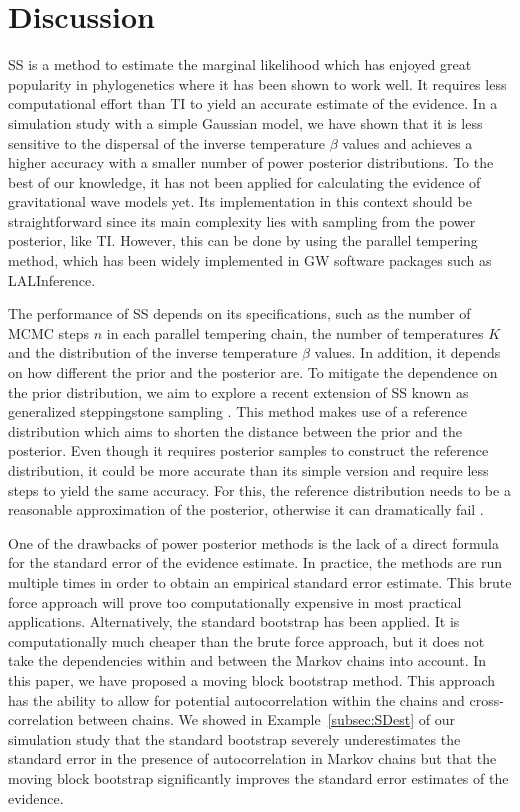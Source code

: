 \documentclass[aps,reprint,amsmath,amssymb,showpacs,showkeys]{revtex4-1}%
\begin{document}
\section{Discussion}
SS is a method to estimate the marginal likelihood which has enjoyed great popularity in phylogenetics where it has been shown to work well.  It requires  less computational effort than TI to yield an accurate estimate of the evidence. In a simulation study with a simple Gaussian model, we have shown that it is less sensitive to the dispersal of the inverse temperature  $\beta$ values and achieves a higher accuracy with a smaller number of power posterior distributions.  To the best of our knowledge, it has not been applied for calculating the evidence of gravitational wave models yet.  Its implementation in this context should be straightforward since its main complexity lies with sampling from the power posterior, like TI.  However, this can be done by using the parallel tempering method, which has been widely implemented in GW software packages such as LALInference. 

The performance of SS depends on its specifications, such as the number of MCMC steps  $n$ in each parallel tempering chain, the number of temperatures $K$ and the distribution of the inverse temperature $\beta$ values.  In addition, it depends on how different the prior and the posterior are.  To mitigate the dependence on the prior distribution, we aim to explore a recent extension of SS  known as generalized steppingstone sampling \citep[GSS;][]{fan:2011}.  This method makes use of a reference distribution which aims to shorten the distance between the prior and the posterior.  Even though it requires posterior samples to construct the reference distribution, it could be more accurate than its simple version and require less steps to yield the same accuracy.  For this, the reference distribution needs to be a reasonable approximation of the posterior, otherwise it can dramatically fail \citep{Maturana:2017b}.  

One of the drawbacks of power posterior methods is the lack of a direct formula for the standard error of the evidence estimate.  In practice, the methods are run multiple times in order to obtain an empirical standard error estimate. This brute force approach  will prove too computationally expensive in most practical applications.  Alternatively,  the standard bootstrap has been applied.
It is computationally much cheaper than the brute force approach, but it does not take  the dependencies within and between the Markov chains  into account.  In this paper, we have proposed a moving block bootstrap method.  This approach has the ability to  allow for potential autocorrelation within the chains and cross-correlation between chains.  We showed in  Example~\ref{subsec:SDest} of our simulation study that the standard bootstrap severely underestimates the standard error in the presence of autocorrelation in  Markov chains but that the moving block bootstrap  significantly improves the standard error estimates of the evidence.  
\end{document}
